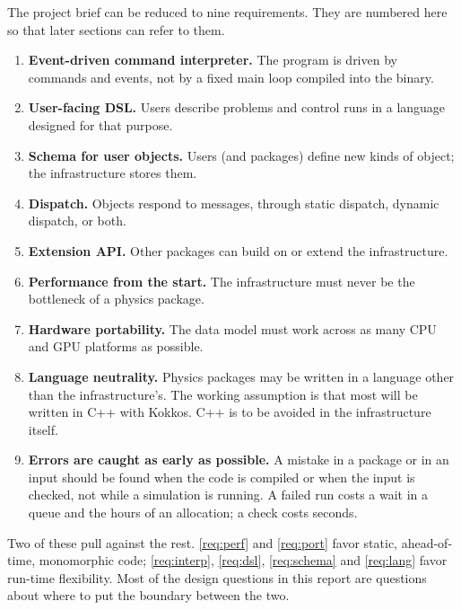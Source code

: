 \documentclass[11pt,a4paper]{article}
\begin{document}
The project brief can be reduced to nine requirements.  They are numbered
here so that later sections can refer to them.

\begin{enumerate}[label=\textbf{R\arabic*},leftmargin=3em]
  \item \label{req:interp} \textbf{Event-driven command interpreter.}  The
        program is driven by commands and events, not by a fixed main loop
        compiled into the binary.
  \item \label{req:dsl} \textbf{User-facing DSL.}  Users describe problems and
        control runs in a language designed for that purpose.
  \item \label{req:schema} \textbf{Schema for user objects.}  Users (and
        packages) define new kinds of object; the infrastructure stores them.
  \item \label{req:dispatch} \textbf{Dispatch.}  Objects respond to messages,
        through static dispatch, dynamic dispatch, or both.
  \item \label{req:api} \textbf{Extension API.}  Other packages can build on
        or extend the infrastructure.
  \item \label{req:perf} \textbf{Performance from the start.}  The
        infrastructure must never be the bottleneck of a physics package.
  \item \label{req:port} \textbf{Hardware portability.}  The data model must
        work across as many CPU and GPU platforms as possible.
  \item \label{req:lang} \textbf{Language neutrality.}  Physics packages may
        be written in a language other than the infrastructure's.  The
        working assumption is that most will be written in C++ with Kokkos.
        C++ is to be avoided in the infrastructure itself.
  \item \label{req:early} \textbf{Errors are caught as early as possible.}
        A mistake in a package or in an input should be found when the code
        is compiled or when the input is checked, not while a simulation is
        running.  A failed run costs a wait in a queue and the hours of an
        allocation; a check costs seconds.
\end{enumerate}

Two of these pull against the rest.  \ref{req:perf} and \ref{req:port} favor
static, ahead-of-time, monomorphic code; \ref{req:interp}, \ref{req:dsl},
\ref{req:schema} and \ref{req:lang} favor run-time flexibility.  Most of the
design questions in this report are questions about where to put the boundary
between the two.
\end{document}
